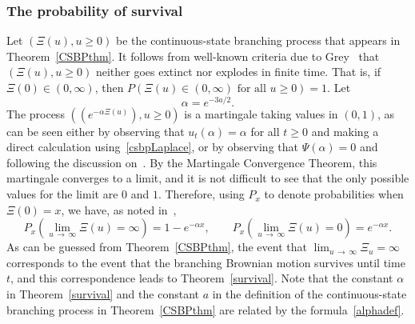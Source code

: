 \documentclass[10pt]{amsart}
\theoremstyle{definition}\newtheorem{defi}[theo]{Definition}\newtheorem{rema}[theo]{Remark}\newtheorem{exam}[theo]{Example}\newtheorem{exem}[theo]{Example}\newtheorem{nota}[theo]{Notation}
\newcommand{\1} {\mathds{1}}
\begin{document}
\subsubsection{The probability of survival}
Let $(\Xi(u), u \geq 0)$ be the continuous-state branching process that appears in Theorem~\ref{CSBPthm}. It follows from well-known criteria due to Grey~\cite{grey} that $(\Xi(u), u \geq 0)$ neither goes extinct nor explodes in finite time. That is, if $\Xi(0) \in (0, \infty)$, then $P(\Xi(u) \in (0, \infty) \text{ for all }u \geq 0) = 1$. Let
\begin{equation}\label{alphadef}
\alpha = e^{-3a/2}.
\end{equation}
The process $((e^{-\alpha \Xi(u)}), u \geq 0)$ is a martingale taking values in $(0, 1)$, as can be seen either by observing that $u_t(\alpha) = \alpha$ for all $t \geq 0$ and making a direct calculation using~\eqref{csbpLaplace}, or by observing that $\Psi(\alpha) = 0$ and following the discussion on~\cite[p.~716]{bfm08}. By the Martingale Convergence Theorem, this martingale converges to a limit, and it is not difficult to see that the only possible values for the limit are $0$ and $1$. Therefore, using $P_x$ to denote probabilities when $\Xi(0) = x$, we have, as noted in~\cite{bfm08},
\begin{equation}\label{CSBPsurvival}
P_x \left(\lim_{u\,\rightarrow\,\infty} \Xi(u) = \infty \right) = 1 - e^{-\alpha x}, \qquad P_x \left(\lim_{u \,\rightarrow\,\infty} \Xi(u) = 0 \right) = e^{-\alpha x}.
\end{equation}
As can be guessed from Theorem~\ref{CSBPthm}, the event that $\lim_{u\,\rightarrow\,\infty} \Xi_u = \infty$ corresponds to the event that the branching Brownian motion survives until time $t$, and this correspondence leads to Theorem~\ref{survival}. Note that the constant $\alpha$ in Theorem~\ref{survival} and the constant $a$ in the definition of the continuous-state branching process in Theorem~\ref{CSBPthm} are related by the formula~\eqref{alphadef}.
\end{document}
